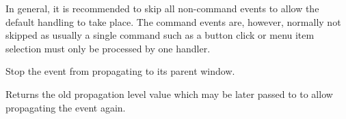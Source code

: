 In general, it is recommended to skip all non-command events to allow the
default handling to take place. The command events are, however, normally not
skipped as usually a single command such as a button click or menu item
selection must only be processed by one handler.


\label{wxeventstoppropagation}


Stop the event from propagating to its parent window.

Returns the old propagation level value which may be later passed to 
 to allow propagating the
event again.

